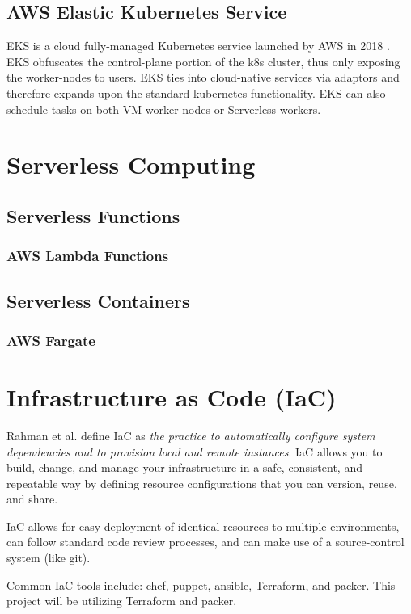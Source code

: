 \section{AWS Elastic Kubernetes Service}
EKS is a cloud fully-managed Kubernetes service launched by AWS in 2018 \cite{eks}. 
EKS obfuscates the control-plane portion of the k8s cluster, thus only exposing the worker-nodes to users.
EKS ties into cloud-native services via adaptors and therefore expands upon the standard kubernetes functionality.
EKS can also schedule tasks on both VM worker-nodes or Serverless workers\cite{hansen_2022}. 

\chapter{Serverless Computing}
\section{Serverless Functions}
\subsection{AWS Lambda Functions}
\section{Serverless Containers}
\subsection{AWS Fargate}

\chapter{Infrastructure as Code (IaC)}
Rahman et al. define IaC as \emph{the practice to automatically configure system dependencies and to provision local and remote instances}\cite{RAHMAN201965}.
IaC allows you to build, change, and manage your infrastructure in a safe, consistent, and repeatable way by defining resource configurations that you can version, reuse, and share\cite{hashicorp_tf_iac}.

IaC allows for easy deployment of identical resources to multiple environments, 
can follow standard code review processes, and can make use of a source-control system (like git).

Common IaC tools include: chef\cite{chef}, puppet\cite{puppet}, ansible\cite{ansible}, Terraform\cite{terraform}, and packer\cite{packer}. 
This project will be utilizing Terraform and packer.
 
